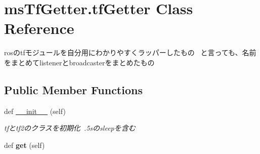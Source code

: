 \hypertarget{classmsTfGetter_1_1tfGetter}{}\section{ms\+Tf\+Getter.\+tf\+Getter Class Reference}
\label{classmsTfGetter_1_1tfGetter}


rosのtfモジュールを自分用にわかりやすくラッパーしたもの~\newline
 と言っても、名前をまとめてlistenerとbroadcasterをまとめたもの  


\subsection*{Public Member Functions}
\begin{DoxyCompactItemize}
\item 
def \hyperlink{classmsTfGetter_1_1tfGetter_a576aeceb58ed338d02d4457b51ec7158}{\+\_\+\+\_\+init\+\_\+\+\_\+} (self)\hypertarget{classmsTfGetter_1_1tfGetter_a576aeceb58ed338d02d4457b51ec7158}{}\label{classmsTfGetter_1_1tfGetter_a576aeceb58ed338d02d4457b51ec7158}

\begin{DoxyCompactList}\small\item\em tfとtf2のクラスを初期化~.\+5sのsleepを含む \end{DoxyCompactList}\item 
def {\bfseries get} (self)\hypertarget{classmsTfGetter_1_1tfGetter_a2fff7638f57fc7b015edce329565f462}{}\label{classmsTfGetter_1_1tfGetter_a2fff7638f57fc7b015edce329565f462}


\end{DoxyCompactItemize}
